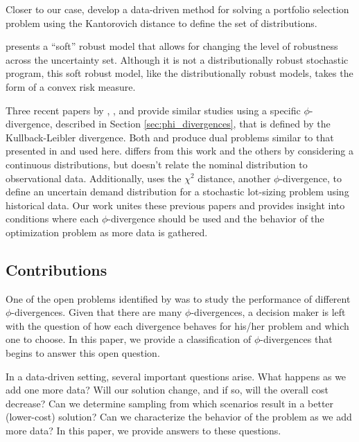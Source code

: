 \documentclass[opre,nonblindrev]{informs3} %
\begin{document}
Closer to our case, \citet{pflug2007ambiguity} develop a data-driven method for solving a portfolio selection problem using the Kantorovich distance to define the set of distributions.

\citet{bental2010soft} presents a ``soft'' robust model that allows for changing the level of robustness across the uncertainty set.
Although it is not a distributionally robust stochastic program, this soft robust model, like the distributionally robust models, takes the form of a convex risk measure.

Three recent papers by \citet{wang2010likelihood}, \citet{calafiore2007ambiguous}, and \citet{hukullback} provide similar studies using a specific $\phi$-divergence, described in Section \ref{sec:phi_divergences}, that is defined by the Kullback-Leibler divergence.
Both \citep{wang2010likelihood} and \citep{hukullback} produce dual problems similar to that presented in \citep{bental2011robust} and used here.
\citet{hukullback} differs from this work and the others by considering a continuous distributions, but doesn't relate the nominal distribution to observational data.
Additionally, \citet{klabjan2013robust} uses the $\chi^2$ distance, another $\phi$-divergence, to define an uncertain demand distribution for a stochastic lot-sizing problem using historical data.
Our work unites these previous papers and provides insight into conditions where each $\phi$-divergence should be used and the behavior of the optimization problem as more data is gathered.

\subsection{Contributions}

One of the open problems identified by \citet{bental2011robust} was to study the performance of different $\phi$-divergences.
Given that there are many $\phi$-divergences, a decision maker is left with the question of how each divergence behaves for his/her problem and which one to choose.
In this paper, we provide a classification of $\phi$-divergences that begins to answer this open question.

In a data-driven setting, several important questions arise.
		What happens as we add one more data?
		Will our solution change, and if so, will the overall cost decrease?
		Can we determine sampling from which scenarios result in a better (lower-cost) solution?
		Can we characterize the behavior of the problem as we add more data?
		In this paper, we provide answers to these questions.
\end{document}
